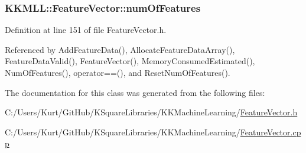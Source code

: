 \subsubsection[{\texorpdfstring{num\+Of\+Features}{numOfFeatures}}]{ K\+K\+M\+L\+L\+::\+Feature\+Vector\+::num\+Of\+Features\hspace{0.3cm}{\ttfamily [protected]}}\hypertarget{class_k_k_m_l_l_1_1_feature_vector_a90af0bdb76783c1aa52d616dbf46e9e4}{}\label{class_k_k_m_l_l_1_1_feature_vector_a90af0bdb76783c1aa52d616dbf46e9e4}


Definition at line 151 of file Feature\+Vector.\+h.



Referenced by Add\+Feature\+Data(), Allocate\+Feature\+Data\+Array(), Feature\+Data\+Valid(), Feature\+Vector(), Memory\+Consumed\+Estimated(), Num\+Of\+Features(), operator==(), and Reset\+Num\+Of\+Features().



The documentation for this class was generated from the following files\+:\begin{DoxyCompactItemize}
\item 
C\+:/\+Users/\+Kurt/\+Git\+Hub/\+K\+Square\+Libraries/\+K\+K\+Machine\+Learning/\hyperlink{_feature_vector_8h}{Feature\+Vector.\+h}\item 
C\+:/\+Users/\+Kurt/\+Git\+Hub/\+K\+Square\+Libraries/\+K\+K\+Machine\+Learning/\hyperlink{_feature_vector_8cpp}{Feature\+Vector.\+cpp}\end{DoxyCompactItemize}
